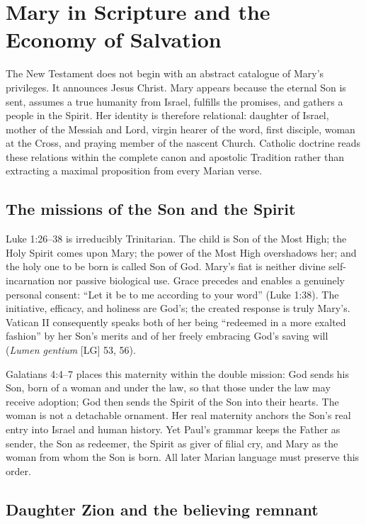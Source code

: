\section{Mary in Scripture and the Economy of Salvation}

The New Testament does not begin with an abstract catalogue of Mary's privileges. It announces Jesus Christ. Mary appears because the eternal Son is sent, assumes a true humanity from Israel, fulfills the promises, and gathers a people in the Spirit. Her identity is therefore relational: daughter of Israel, mother of the Messiah and Lord, virgin hearer of the word, first disciple, woman at the Cross, and praying member of the nascent Church. Catholic doctrine reads these relations within the complete canon and apostolic Tradition rather than extracting a maximal proposition from every Marian verse.

\subsection{The missions of the Son and the Spirit}

Luke 1:26--38 is irreducibly Trinitarian. The child is Son of the Most High; the Holy Spirit comes upon Mary; the power of the Most High overshadows her; and the holy one to be born is called Son of God. Mary's fiat is neither divine self-incarnation nor passive biological use. Grace precedes and enables a genuinely personal consent: ``Let it be to me according to your word'' (Luke 1:38). The initiative, efficacy, and holiness are God's; the created response is truly Mary's. Vatican II consequently speaks both of her being ``redeemed in a more exalted fashion'' by her Son's merits and of her freely embracing God's saving will (\emph{Lumen gentium} [LG] 53, 56).

Galatians 4:4--7 places this maternity within the double mission: God sends his Son, born of a woman and under the law, so that those under the law may receive adoption; God then sends the Spirit of the Son into their hearts. The woman is not a detachable ornament. Her real maternity anchors the Son's real entry into Israel and human history. Yet Paul's grammar keeps the Father as sender, the Son as redeemer, the Spirit as giver of filial cry, and Mary as the woman from whom the Son is born. All later Marian language must preserve this order.

\subsection{Daughter Zion and the believing remnant}

